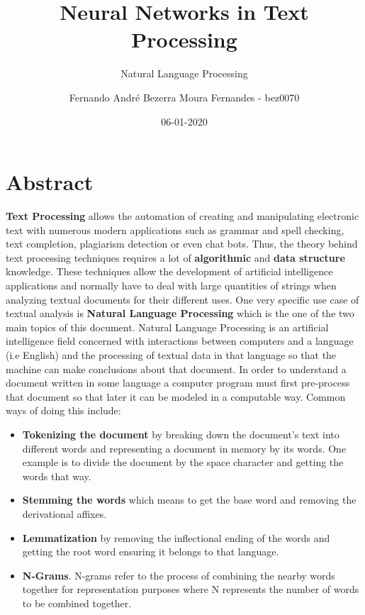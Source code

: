 \documentclass{scrartcl}
\title{Neural Networks in Text Processing}
\subtitle{ Natural Language Processing }
\date{06-01-2020}
\author{Fernando André Bezerra Moura Fernandes - bez0070}
\begin{document}
    \maketitle
    \newpage
    \tableofcontents
    \newpage
    \section{ Abstract }
    \textbf{Text Processing} allows the automation of creating and manipulating electronic text 
    with numerous modern applications such as grammar and spell checking, text completion,
    plagiarism detection or even chat bots. Thus, the theory behind text processing techniques
    requires a lot of \textbf{algorithmic} and \textbf{data structure} knowledge. \newline
    These techniques allow the development of artificial intelligence applications and
    normally have to deal with large quantities of strings when analyzing textual documents
    for their different uses. \newline
    One very specific use case of textual analysis is \textbf{Natural Language Processing} 
    which is the one of the two main topics of this document. \newline
    Natural Language Processing is an artificial intelligence field concerned with 
    interactions between computers and a language (i.e English) and the
    processing of textual data in that language so that the machine can make
    conclusions about that document. \newline
    In order to understand a document written in some language a computer program must first
    pre-process that document so that later it can be modeled in a computable way. 
    Common ways of doing this include:
    \begin{itemize}
        \item \textbf{Tokenizing the document} by breaking down the document's text into 
        different words and representing a document in memory by its words. One example is to
        divide the document by the space character and getting the words that way.
        \item \textbf{Stemming the words} which means to get the base word and removing the 
        derivational affixes.  
        \item \textbf{Lemmatization} by removing the inflectional ending of the words and getting
        the root word ensuring it belongs to that language.
        \item \textbf{N-Grams}. N-grams refer to the process of combining the nearby words 
        together for representation purposes where N represents the number of words to be 
        combined together.
    \end{itemize}
\end{document}
